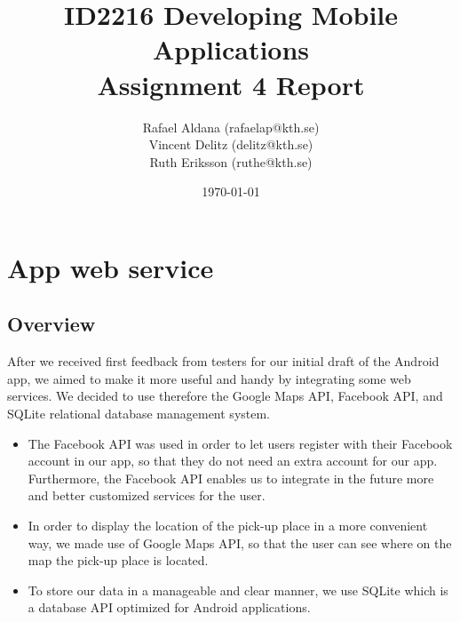 \documentclass[11pt,twoside,a4paper]{report}
\begin{document}
\title{ID2216 Developing Mobile Applications\\Assignment 4 Report}
\author{Rafael Aldana (rafaelap@kth.se)\\Vincent Delitz (delitz@kth.se)\\Ruth Eriksson (ruthe@kth.se)}
\date{\today}
\maketitle



\tableofcontents
\thispagestyle{empty}



\renewcommand{\chaptername}{Assignment}
\setcounter{chapter}{3}


\chapter{App web service}
\label{assignment:app-web-service}

\section{Overview}

After we received first feedback from testers for our initial draft of the Android app, we aimed to make it more useful and handy by integrating some web services. We decided to use therefore the Google Maps API, Facebook API, and SQLite relational database management system.

\begin{itemize}

\item The Facebook API was used in order to let users register with their Facebook account in our app, so that they do not need an extra account for our app. Furthermore, the Facebook API enables us to integrate in the future more and better customized services for the user.

\item In order to display the location of the pick-up place in a more convenient way, we made use of Google Maps API, so that the user can see where on the map the pick-up place is located.

\item To store our data in a manageable and clear manner, we use SQLite which is a database API optimized for Android applications.

\end{itemize}
\end{document}
